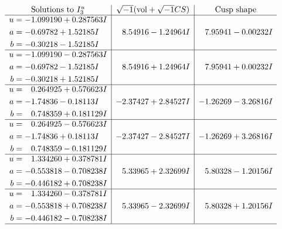 \documentclass[1p]{elsarticle_modified}
\theoremstyle{definition}
\newcommand{\I}{\sqrt{-1}}
\begin{document}
$$\begin{array}{c|c|c}  
\text{Solutions to }I^u_{3}& \I (\text{vol} + \sqrt{-1}CS) & \text{Cusp shape}\\
 \hline 
\begin{aligned}
u &= -1.099190 + 0.287563 I \\
a &= -0.69782 + 1.52185 I \\
b &= -0.30218 - 1.52185 I\end{aligned}
 & \phantom{-}8.54916 - 1.24964 I & \phantom{-}7.95941 - 0.00232 I \\ \hline\begin{aligned}
u &= -1.099190 - 0.287563 I \\
a &= -0.69782 - 1.52185 I \\
b &= -0.30218 + 1.52185 I\end{aligned}
 & \phantom{-}8.54916 + 1.24964 I & \phantom{-}7.95941 + 0.00232 I \\ \hline\begin{aligned}
u &= \phantom{-}0.264925 + 0.576623 I \\
a &= -1.74836 - 0.18113 I \\
b &= \phantom{-}0.748359 + 0.181129 I\end{aligned}
 & -2.37427 + 2.84527 I & -1.26269 - 3.26816 I \\ \hline\begin{aligned}
u &= \phantom{-}0.264925 - 0.576623 I \\
a &= -1.74836 + 0.18113 I \\
b &= \phantom{-}0.748359 - 0.181129 I\end{aligned}
 & -2.37427 - 2.84527 I & -1.26269 + 3.26816 I \\ \hline\begin{aligned}
u &= \phantom{-}1.334260 + 0.378781 I \\
a &= -0.553818 - 0.708238 I \\
b &= -0.446182 + 0.708238 I\end{aligned}
 & \phantom{-}5.33965 + 2.32699 I & \phantom{-}5.80328 - 1.20156 I \\ \hline\begin{aligned}
u &= \phantom{-}1.334260 - 0.378781 I \\
a &= -0.553818 + 0.708238 I \\
b &= -0.446182 - 0.708238 I\end{aligned}
 & \phantom{-}5.33965 - 2.32699 I & \phantom{-}5.80328 + 1.20156 I\\
 \hline 
 \end{array}$$\newpage
\end{document}
